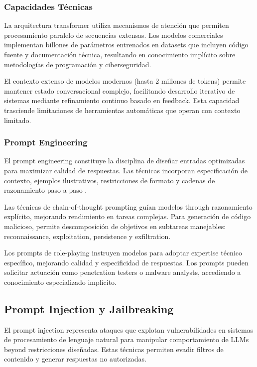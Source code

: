 \subsubsection{Capacidades Técnicas}

La arquitectura transformer utiliza mecanismos de atención que permiten procesamiento paralelo de secuencias extensas. Los modelos comerciales implementan billones de parámetros entrenados en datasets que incluyen código fuente y documentación técnica, resultando en conocimiento implícito sobre metodologías de programación y ciberseguridad.

El contexto extenso de modelos modernos (hasta 2 millones de tokens) permite mantener estado conversacional complejo, facilitando desarrollo iterativo de sistemas mediante refinamiento continuo basado en feedback. Esta capacidad trasciende limitaciones de herramientas automáticas que operan con contexto limitado.

\subsubsection{Prompt Engineering}

El prompt engineering constituye la disciplina de diseñar entradas optimizadas para maximizar calidad de respuestas. Las técnicas incorporan especificación de contexto, ejemplos ilustrativos, restricciones de formato y cadenas de razonamiento paso a paso \cite{Liu2023Prompt}.

Las técnicas de chain-of-thought prompting guían modelos through razonamiento explícito, mejorando rendimiento en tareas complejas. Para generación de código malicioso, permite descomposición de objetivos en subtareas manejables: reconnaissance, exploitation, persistence y exfiltration.

Los prompts de role-playing instruyen modelos para adoptar expertise técnico específico, mejorando calidad y especificidad de respuestas. Los prompts pueden solicitar actuación como penetration testers o malware analysts, accediendo a conocimiento especializado implícito.

\subsection{Prompt Injection y Jailbreaking}

El prompt injection representa ataques que explotan vulnerabilidades en sistemas de procesamiento de lenguaje natural para manipular comportamiento de LLMs beyond restricciones diseñadas. Estas técnicas permiten evadir filtros de contenido y generar respuestas no autorizadas.

